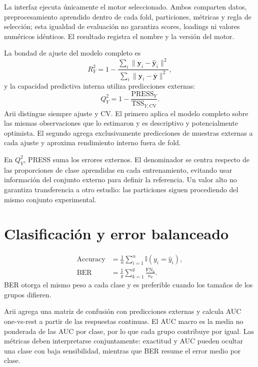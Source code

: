 \documentclass[11pt,a4paper,openany]{report}
\newcommand{\RtwoY}{R^{2}_{Y}}
\newcommand{\QtwoY}{Q^{2}_{Y}}
\newcommand{\vect}[1]{\boldsymbol{#1}}
\begin{document}
La interfaz ejecuta únicamente el motor seleccionado. Ambos comparten datos, preprocesamiento aprendido dentro de cada fold, particiones, métricas y regla de selección; esta igualdad de evaluación no garantiza scores, loadings ni valores numéricos idénticos. El resultado registra el nombre y la versión del motor.

La bondad de ajuste del modelo completo es
\begin{equation}
  \RtwoY = 1-\frac{\sum_i\lVert\vect{y}_i-\widehat{\vect{y}}_i\rVert^2}
  {\sum_i\lVert\vect{y}_i-\bar{\vect{y}}\rVert^2},
\end{equation}
y la capacidad predictiva interna utiliza predicciones externas:
\begin{equation}
  \QtwoY = 1-\frac{\mathrm{PRESS}_{Y}}{\mathrm{TSS}_{Y,\mathrm{CV}}}.
\end{equation}
Arii distingue siempre ajuste y CV. El primero aplica el modelo completo sobre las mismas observaciones que lo estimaron y es descriptivo y potencialmente optimista. El segundo agrega exclusivamente predicciones de muestras externas a cada ajuste y aproxima rendimiento interno fuera de fold.

En $\QtwoY$, PRESS suma los errores externos. El denominador se centra respecto de las proporciones de clase aprendidas en cada entrenamiento, evitando usar información del conjunto externo para definir la referencia. Un valor alto no garantiza transferencia a otro estudio: las particiones siguen procediendo del mismo conjunto experimental.

\section{Clasificación y error balanceado}
\begin{align}
  \mathrm{Accuracy} &= \frac{1}{n}\sum_{i=1}^{n}
    \mathbb{I}(y_i=\widehat{y}_i), \\
  \mathrm{BER} &= \frac{1}{g}\sum_{k=1}^{g}\frac{\mathrm{FN}_{k}}{n_k}.
\end{align}
BER otorga el mismo peso a cada clase y es preferible cuando los tamaños de los grupos difieren.

Arii agrega una matriz de confusión con predicciones externas y calcula AUC one-vs-rest a partir de las respuestas continuas. El AUC macro es la media no ponderada de las AUC por clase, por lo que cada grupo contribuye por igual. Las métricas deben interpretarse conjuntamente: exactitud y AUC pueden ocultar una clase con baja sensibilidad, mientras que BER resume el error medio por clase.
\end{document}
